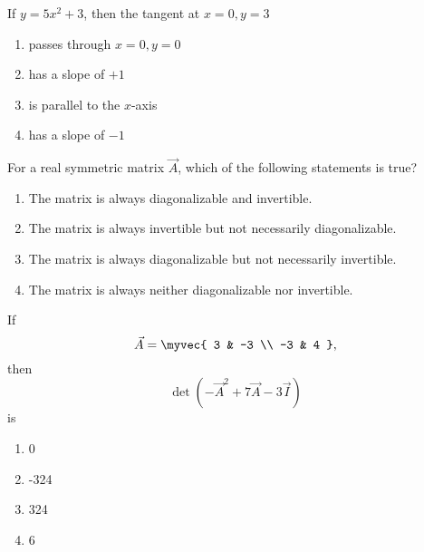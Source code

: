 \item If $y = 5x^{2} + 3$, then the tangent at $x = 0, y = 3$
\hfill{}
\begin{enumerate}
    \item passes through $x = 0, y = 0$
    \item has a slope of $+1$
    \item is parallel to the $x$-axis
    \item has a slope of $-1$
\end{enumerate}
\item For a real symmetric matrix \(\vec{A}\), which of the following statements is true?
\hfill{}
\begin{enumerate}
    \item The matrix is always diagonalizable and invertible.
    \item The matrix is always invertible but not necessarily diagonalizable.
    \item The matrix is always diagonalizable but not necessarily invertible.
    \item The matrix is always neither diagonalizable nor invertible.
\end{enumerate}
\item  
If  
$$
\vec{A} = \myvec{
3 & -3 \\
-3 & 4
},
$$
then  
$$
\det\left(-\vec{A}^2 + 7\vec{A} - 3\vec{I} \right) 
$$
is
\hfill{}
\begin{multicols}{4}
\begin{enumerate}
    \item 0
    \item -324
    \item 324
    \item 6
\end{enumerate}
\end{multicols}

